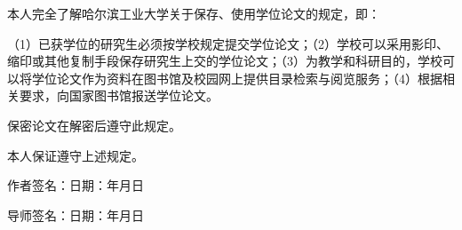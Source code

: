 本人完全了解哈尔滨工业大学关于保存、使用学位论文的规定，即：

（1）已获学位的研究生必须按学校规定提交学位论文；（2）学校可以采用影印、缩印或其他复制手段保存研究生上交的学位论文；（3）为教学和科研目的，学校可以将学位论文作为资料在图书馆及校园网上提供目录检索与阅览服务；（4）根据相关要求，向国家图书馆报送学位论文。

保密论文在解密后遵守此规定。
\vspace{\baselineskip}

本人保证遵守上述规定。

\vspace{2\baselineskip}
\hspace{6em}作者签名：\hfill 日期：\hspace{2.5em}年\hspace{1.5em}月\hspace{1.5em}日

\vspace{2\baselineskip}
\hspace{6em}导师签名：\hfill 日期：\hspace{2.5em}年\hspace{1.5em}月\hspace{1.5em}日